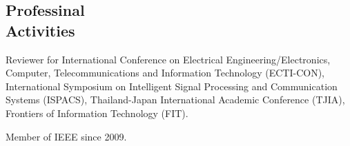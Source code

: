 \documentclass[margin, 10pt]{res}
\begin{document}
\begin{resume}
\section{Professinal \\ Activities}

Reviewer for International Conference on Electrical Engineering/Electronics,
Computer, Telecommunications and Information Technology (ECTI-CON),
International Symposium on Intelligent Signal Processing and Communication
Systems (ISPACS), Thailand-Japan International Academic Conference (TJIA),
Frontiers of Information Technology (FIT).

Member of IEEE since 2009.

\end{resume}
\end{document}
